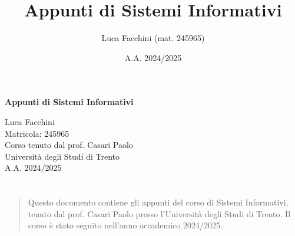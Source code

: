 \documentclass[twoside]{report}
\title{Appunti di Sistemi Informativi}
\author{Luca Facchini (mat. 245965)}
\date{A.A. 2024/2025}
\makeatletter
\renewenvironment{abstract}{%
    \if@twocolumn
        \section*{\abstractname}%
    \else
        \begin{center}%
            {\bfseries \abstractname\vspace{-.5em}\vspace{\z@}}%
        \end{center}%
        \small
        \begin{quotation}
    \fi}
    {\if@twocolumn\else\end{quotation}\fi}
\makeatother
\begin{document}
    \begin{titlepage}
        \centering  %
        {\Huge\textbf{Appunti di Sistemi Informativi}} \\[1cm] %
        \vspace{0.5cm}
        
        {\Large Luca Facchini} \\ %
        \vspace{0.3cm}
        {\large Matricola: 245965} \\[2cm] %
        
        {\large Corso tenuto dal prof. Casari Paolo} \\[0.3cm] %
        {\large Università degli Studi di Trento} \\[1.5cm]
        
        {\large A.A. 2024/2025} \\[3cm] %
        
        \vfill
        \begin{abstract}
            Questo documento contiene gli appunti del corso di Sistemi Informativi, tenuto dal prof. Casari Paolo presso l'Università degli Studi di Trento. Il corso è stato seguito nell'anno accademico 2024/2025.
        \end{abstract}
        
        \vfill  %
    \end{titlepage}

    \pagestyle{fancy}
    \fancyhead{}
    \fancyhead[RO,LE]{\leftmark}
    \setlength{\headheight}{15pt}
    \fancyfoot{}
    \fancyfoot[LE,RO]{\thepage}
    
    \begingroup
        \tableofcontents
        \thispagestyle{stdPage}
    \endgroup
    
    
    
    

    
    
\end{document}
